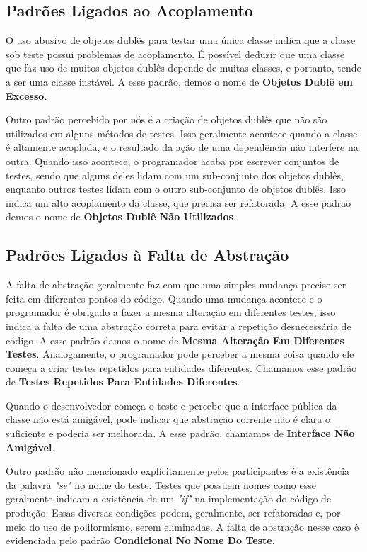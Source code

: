 \subsection{Padrões Ligados ao Acoplamento}

O uso abusivo de objetos dublês para testar uma
única classe indica que a classe sob teste possui problemas
de acoplamento. É possível deduzir que uma classe que faz uso de muitos
objetos dublês depende de muitas classes, e portanto, tende a ser
uma classe instável. A esse padrão, demos o nome de \textbf{Objetos Dublê em Excesso}.

Outro padrão percebido por nós é a criação de objetos dublês que não
são utilizados em alguns métodos de testes. Isso geralmente acontece quando
a classe é altamente acoplada, e o resultado da ação de uma dependência não
interfere na outra. Quando isso acontece, o programador acaba por escrever
conjuntos de testes, sendo que alguns deles lidam com um sub-conjunto dos objetos dublês,
enquanto outros testes lidam com o outro sub-conjunto de objetos dublês. 
Isso indica um alto acoplamento 
da classe, que precisa ser refatorada. A esse padrão demos o nome de
\textbf{Objetos Dublê Não Utilizados}.


\subsection{Padrões Ligados à Falta de Abstração}

A falta de abstração geralmente faz com que uma simples mudança precise
ser feita em diferentes pontos do código. Quando uma mudança acontece e 
o programador é obrigado a fazer a mesma alteração em diferentes testes,
isso indica a falta de uma abstração correta para evitar a 
repetição desnecessária de código.
A esse padrão damos o nome de \textbf{Mesma Alteração Em Diferentes Testes}.
Analogamente, o programador pode perceber a mesma coisa
quando ele começa a criar testes repetidos para entidades diferentes.
Chamamos esse padrão de \textbf{Testes Repetidos Para Entidades Diferentes}.

Quando o desenvolvedor começa o teste e percebe que a interface pública da classe
não está amigável, pode indicar que abstração
corrente não é clara o suficiente e poderia ser melhorada. A esse padrão,
chamamos de \textbf{Interface Não Amigável}.

Outro padrão não mencionado explícitamente pelos participantes 
é a existência da palavra \textit{"se"} no nome do teste. Testes que
possuem nomes como esse geralmente indicam a existência de um \textit{"if"} na implementação
do código de produção. Essas diversas condições podem, geralmente, ser refatoradas e,
por meio do uso de poliformismo, serem eliminadas. A falta de abstração nesse caso
é evidenciada pelo padrão \textbf{Condicional No Nome Do Teste}.

